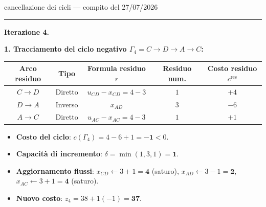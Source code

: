 \documentclass[11pt,a4paper]{article}
\newcommand{\mcfnodes}{%
  \node[nd] (A) at (0,2.1) {$A$};
  \node[nd] (B) at (0,-2.1) {$B$};
  \node[nd] (C) at (3.0,0) {$C$};
  \node[nd] (D) at (6.0,2.1) {$D$};
  \node[nd] (E) at (6.0,-2.1) {$E$};}
\newcommand{\ra}[4]{\draw[#1,thick,black!65] (#2) -- node[font=\scriptsize,black!70,fill=amber!5,inner sep=1pt]{$#4$} (#3);}
\newcommand{\cy}[3]{\draw[->,line width=1.2pt,crimson] (#1) to[bend left=16] node[font=\scriptsize,crimson,fill=amber!5,inner sep=1pt]{$#3$} (#2);}
\newcommand{\fa}[4]{\draw[->,thick,black!45] (#1) -- node[font=\scriptsize,black!55,sloped,above,inner sep=1.5pt]{$#3$} node[font=\small,teal,sloped,below,inner sep=1.5pt]{$\mathbf{#4}$} (#2);}
\begin{document}
\begin{es}{cancellazione dei cicli --- compito del 27/07/2026}
\begin{center}
\begin{minipage}[t]{0.48\textwidth}\centering
{}
\par\vspace{1mm}{\scriptsize $G_x$ post it. 2: evidenziato $\Gamma_3$ ($c=-2$, $\delta=2$)}
\end{minipage}\hfill
\begin{minipage}[t]{0.48\textwidth}\centering
{}
\par\vspace{1mm}{\scriptsize $G$ dopo iterazione 3 (costo $38$)}
\end{minipage}
\end{center}

\medskip
\hrule
\medskip

\textbf{Iterazione 4.}

\textbf{1. Tracciamento del ciclo negativo $\Gamma_4 = C \to D \to A \to C$:}
\begin{center}
\small
\begin{tabular}{@{}ccccc@{}}
\toprule
\textbf{Arco residuo} & \textbf{Tipo} & \textbf{Formula residuo $r$} & \textbf{Residuo num.} & \textbf{Costo residuo $c^{\text{res}}$}\\
\midrule
$C \to D$ & Diretto & $u_{CD} - x_{CD} = 4 - 3$ & $1$ & $+4$\\
$D \to A$ & Inverso & $x_{AD}$ & $3$ & $-6$\\
$A \to C$ & Diretto & $u_{AC} - x_{AC} = 4 - 3$ & $1$ & $+1$\\
\bottomrule
\end{tabular}
\end{center}
\begin{itemize}[itemsep=0.15em]
\item \textbf{Costo del ciclo}: $c(\Gamma_4) = 4 - 6 + 1 = \mathbf{-1} < 0$.
\item \textbf{Capacità di incremento}: $\delta = \min(1, 3, 1) = \mathbf{1}$.
\item \textbf{Aggiornamento flussi}:
  $x_{CD} \leftarrow 3 + 1 = \mathbf{4}$ (saturo), \quad
  $x_{AD} \leftarrow 3 - 1 = \mathbf{2}$, \quad
  $x_{AC} \leftarrow 3 + 1 = \mathbf{4}$ (saturo).
\item \textbf{Nuovo costo}: $z_4 = 38 + 1(-1) = \mathbf{37}$.
\end{itemize}


\end{es}
\end{document}

